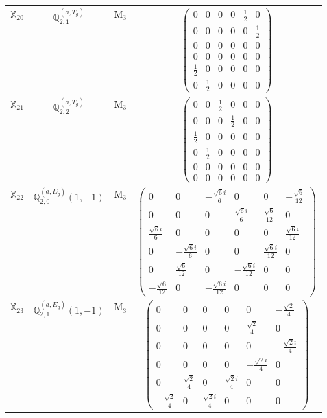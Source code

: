 \documentclass[fleqn,10pt,landscape]{article}
\begin{document}
\begin{itemize}
\begin{center}
\begin{longtable}{c|c|c|c}
$ \mathbb{X}_{20} $ & $\mathbb{Q}_{2,1}^{(a,T_{g})}$ & M$_{3}$ & $\begin{pmatrix} 0 & 0 & 0 & 0 & \frac{1}{2} & 0 \\ 0 & 0 & 0 & 0 & 0 & \frac{1}{2} \\ 0 & 0 & 0 & 0 & 0 & 0 \\ 0 & 0 & 0 & 0 & 0 & 0 \\ \frac{1}{2} & 0 & 0 & 0 & 0 & 0 \\ 0 & \frac{1}{2} & 0 & 0 & 0 & 0 \end{pmatrix}$ \\
$ \mathbb{X}_{21} $ & $\mathbb{Q}_{2,2}^{(a,T_{g})}$ & M$_{3}$ & $\begin{pmatrix} 0 & 0 & \frac{1}{2} & 0 & 0 & 0 \\ 0 & 0 & 0 & \frac{1}{2} & 0 & 0 \\ \frac{1}{2} & 0 & 0 & 0 & 0 & 0 \\ 0 & \frac{1}{2} & 0 & 0 & 0 & 0 \\ 0 & 0 & 0 & 0 & 0 & 0 \\ 0 & 0 & 0 & 0 & 0 & 0 \end{pmatrix}$ \\
$ \mathbb{X}_{22} $ & $\mathbb{Q}_{2,0}^{(a,E_{g})}(1,-1)$ & M$_{3}$ & $\begin{pmatrix} 0 & 0 & - \frac{\sqrt{6} i}{6} & 0 & 0 & - \frac{\sqrt{6}}{12} \\ 0 & 0 & 0 & \frac{\sqrt{6} i}{6} & \frac{\sqrt{6}}{12} & 0 \\ \frac{\sqrt{6} i}{6} & 0 & 0 & 0 & 0 & \frac{\sqrt{6} i}{12} \\ 0 & - \frac{\sqrt{6} i}{6} & 0 & 0 & \frac{\sqrt{6} i}{12} & 0 \\ 0 & \frac{\sqrt{6}}{12} & 0 & - \frac{\sqrt{6} i}{12} & 0 & 0 \\ - \frac{\sqrt{6}}{12} & 0 & - \frac{\sqrt{6} i}{12} & 0 & 0 & 0 \end{pmatrix}$ \\
$ \mathbb{X}_{23} $ & $\mathbb{Q}_{2,1}^{(a,E_{g})}(1,-1)$ & M$_{3}$ & $\begin{pmatrix} 0 & 0 & 0 & 0 & 0 & - \frac{\sqrt{2}}{4} \\ 0 & 0 & 0 & 0 & \frac{\sqrt{2}}{4} & 0 \\ 0 & 0 & 0 & 0 & 0 & - \frac{\sqrt{2} i}{4} \\ 0 & 0 & 0 & 0 & - \frac{\sqrt{2} i}{4} & 0 \\ 0 & \frac{\sqrt{2}}{4} & 0 & \frac{\sqrt{2} i}{4} & 0 & 0 \\ - \frac{\sqrt{2}}{4} & 0 & \frac{\sqrt{2} i}{4} & 0 & 0 & 0 \end{pmatrix}$ \\

\end{longtable}
\end{center}
\end{itemize}
\end{document}
